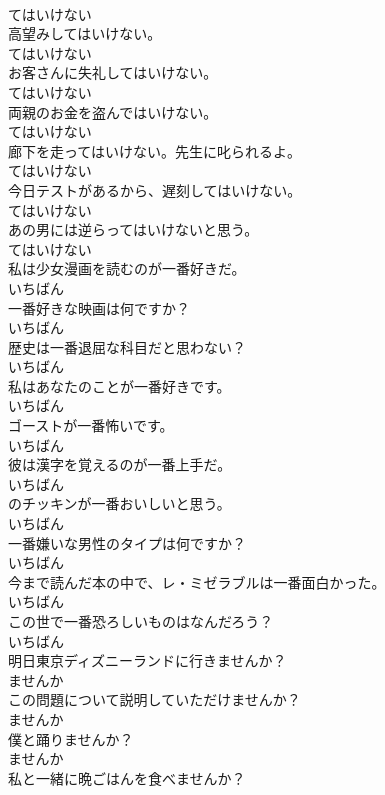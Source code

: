 \documentclass[8pt]{extreport}
\begin{document}
\begin{CJK}{UTF8}{min}
\\	てはいけない	
\\	高望みしてはいけない。	
\\	てはいけない	
\\	お客さんに失礼してはいけない。	
\\	てはいけない	
\\	両親のお金を盗んではいけない。	
\\	てはいけない	
\\	廊下を走ってはいけない。先生に叱られるよ。	
\\	てはいけない	
\\	今日テストがあるから、遅刻してはいけない。	
\\	てはいけない	
\\	あの男には逆らってはいけないと思う。	
\\	てはいけない	
\\	私は少女漫画を読むのが一番好きだ。	
\\	いちばん	
\\	一番好きな映画は何ですか？	
\\	いちばん	
\\	歴史は一番退屈な科目だと思わない？	
\\	いちばん	
\\	私はあなたのことが一番好きです。	
\\	いちばん	
\\	ゴーストが一番怖いです。	
\\	いちばん	
\\	彼は漢字を覚えるのが一番上手だ。	
\\	いちばん	
\\	のチッキンが一番おいしいと思う。	
\\	いちばん	
\\	一番嫌いな男性のタイプは何ですか？	
\\	いちばん	
\\	今まで読んだ本の中で、レ・ミゼラブルは一番面白かった。	
\\	いちばん	
\\	この世で一番恐ろしいものはなんだろう？	
\\	いちばん	
\\	明日東京ディズニーランドに行きませんか？	
\\	ませんか	
\\	この問題について説明していただけませんか？	
\\	ませんか	
\\	僕と踊りませんか？	
\\	ませんか	
\\	私と一緒に晩ごはんを食べませんか？	

\end{CJK}
\end{document}
